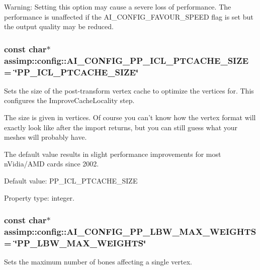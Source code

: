 Warning\+: Setting this option may cause a severe loss of performance. The performance is unaffected if the {\ttfamily A\+I\+\_\+\+C\+O\+N\+F\+I\+G\+\_\+\+F\+A\+V\+O\+U\+R\+\_\+\+S\+P\+E\+E\+D} flag is set but the output quality may be reduced. \hypertarget{namespaceassimp_1_1config_ada3e280af847875daf4d19c98526a470}{
\subsubsection[{A\+I\+\_\+\+C\+O\+N\+F\+I\+G\+\_\+\+P\+P\+\_\+\+I\+C\+L\+\_\+\+P\+T\+C\+A\+C\+H\+E\+\_\+\+S\+I\+Z\+E}]{\setlength{\rightskip}{0pt plus 5cm}const char$\ast$ assimp\+::config\+::\+A\+I\+\_\+\+C\+O\+N\+F\+I\+G\+\_\+\+P\+P\+\_\+\+I\+C\+L\+\_\+\+P\+T\+C\+A\+C\+H\+E\+\_\+\+S\+I\+Z\+E = \char`\"{}P\+P\+\_\+\+I\+C\+L\+\_\+\+P\+T\+C\+A\+C\+H\+E\+\_\+\+S\+I\+Z\+E\char`\"{}}}\label{namespaceassimp_1_1config_ada3e280af847875daf4d19c98526a470}
Sets the size of the post-\/transform vertex cache to optimize the vertices for. This configures the {\ttfamily Improve\+Cache\+Locality} step.

The size is given in vertices. Of course you can't know how the vertex format will exactly look like after the import returns, but you can still guess what your meshes will probably have.

The default value results in slight performance improvements for most n\+Vidia/\+A\+M\+D cards since 2002.

Default value\+: P\+P\+\_\+\+I\+C\+L\+\_\+\+P\+T\+C\+A\+C\+H\+E\+\_\+\+S\+I\+Z\+E

Property type\+: integer. \hypertarget{namespaceassimp_1_1config_aa43cd229320d7c01e9d8ade92b3c0e5e}{
\subsubsection[{A\+I\+\_\+\+C\+O\+N\+F\+I\+G\+\_\+\+P\+P\+\_\+\+L\+B\+W\+\_\+\+M\+A\+X\+\_\+\+W\+E\+I\+G\+H\+T\+S}]{\setlength{\rightskip}{0pt plus 5cm}const char$\ast$ assimp\+::config\+::\+A\+I\+\_\+\+C\+O\+N\+F\+I\+G\+\_\+\+P\+P\+\_\+\+L\+B\+W\+\_\+\+M\+A\+X\+\_\+\+W\+E\+I\+G\+H\+T\+S = \char`\"{}P\+P\+\_\+\+L\+B\+W\+\_\+\+M\+A\+X\+\_\+\+W\+E\+I\+G\+H\+T\+S\char`\"{}}}\label{namespaceassimp_1_1config_aa43cd229320d7c01e9d8ade92b3c0e5e}
Sets the maximum number of bones affecting a single vertex.


